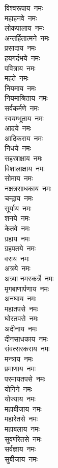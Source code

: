\begin{multicols}{2}
\begin{flushleft}
विश्वरूपाय~नमः\\
महाहनवे~नमः\\
लोकपालाय~नमः\\
अन्तर्हितात्मने~नमः\\
प्रसादाय~नमः\\
हयगर्दभये~नमः\\
पवित्राय~नमः\hfill{}\\
महते~नमः\\
नियमाय~नमः\\
नियमाश्रिताय~नमः\\
सर्वकर्मणे~नमः\\
स्वयम्भूताय~नमः\\
आदये~नमः\\
आदिकराय~नमः\\
निधये~नमः\\
सहस्राक्षाय~नमः\\
विशालाक्षाय~नमः\hfill{}\\
सोमाय~नमः\\
नक्षत्रसाधकाय~नमः\\
चन्द्राय~नमः\\
सूर्याय~नमः\\
शनये~नमः\\
केतवे~नमः\\
ग्रहाय~नमः\\
ग्रहपतये~नमः\\
वराय~नमः\\
अत्रये~नमः\hfill{}\\
अत्र्या नमस्कर्त्रे~नमः\\
मृगबाणार्पणाय~नमः\\
अनघाय~नमः\\
महातपसे~नमः\\
घोरतपसे~नमः\\
अदीनाय~नमः\\
दीनसाधकाय~नमः\\
संवत्सरकराय~नमः\\
मन्त्राय~नमः\\
प्रमाणाय~नमः\hfill{}\\
परमायतपसे~नमः\\
योगिने~नमः\\
योज्याय~नमः\\
महाबीजाय~नमः\\
महारेतसे~नमः\\
महाबलाय~नमः\\
सुवर्णरेतसे~नमः\\
सर्वज्ञाय~नमः\\
सुबीजाय~नमः\\

\end{flushleft}
\end{multicols}
